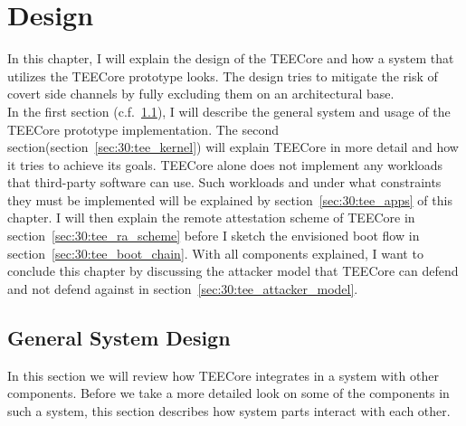 \chapter{Design}
\label{sec:design}



In this chapter, I will explain the design of the TEECore and how a system that
utilizes the TEECore prototype looks. The design tries to mitigate the risk of
covert side channels by fully excluding them on an architectural base.\\

In the first section (c.f.~\ref{sec:30:tee_general}), I will describe the
general system and usage of the TEECore prototype implementation. The second
section(section~\ref{sec:30:tee_kernel}) will explain TEECore in more detail and
how it tries to achieve its goals. TEECore alone does not implement any
workloads that third-party software can use. Such workloads and under what
constraints they must be implemented will be explained by
section~\ref{sec:30:tee_apps} of this chapter. I will then explain the remote
attestation scheme of TEECore in section~\ref{sec:30:tee_ra_scheme} before I
sketch the envisioned boot flow in section~\ref{sec:30:tee_boot_chain}. With all
components explained, I want to conclude this chapter by discussing the attacker
model that TEECore can defend and not defend against in
section~\ref{sec:30:tee_attacker_model}.

\section{General System Design}
\label{sec:30:tee_general}
In this section we will review how TEECore integrates in a system with other
components. Before we take a more detailed look on some of the components in
such a system, this section describes how system parts interact with each other.


